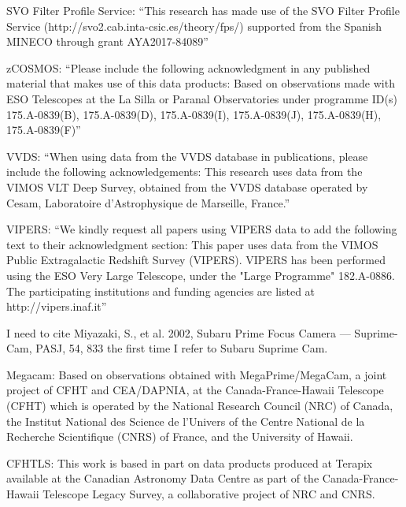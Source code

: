 
SVO Filter Profile Service: ``This research has made use of the SVO Filter Profile Service (http://svo2.cab.inta-csic.es/theory/fps/) supported from the Spanish MINECO through grant AYA2017-84089''

zCOSMOS: ``Please include the following acknowledgment in any published material that makes use of this data products: Based on observations made with ESO Telescopes at the La Silla or Paranal Observatories under programme ID(s) 175.A-0839(B), 175.A-0839(D), 175.A-0839(I), 175.A-0839(J), 175.A-0839(H), 175.A-0839(F)''

VVDS: ``When using data from the VVDS database in publications, please include the following acknowledgements: This research uses data from the VIMOS VLT Deep Survey, obtained from the VVDS database operated by Cesam, Laboratoire d'Astrophysique de Marseille, France.''

VIPERS: ``We kindly request all papers using VIPERS data to add the following text to their acknowledgment section: This paper uses data from the VIMOS Public Extragalactic Redshift Survey (VIPERS). VIPERS has been performed using the ESO Very Large Telescope, under the "Large Programme" 182.A-0886. The participating institutions and funding agencies are listed at http://vipers.inaf.it''

I need to cite Miyazaki, S., et al. 2002, Subaru Prime Focus Camera --- Suprime-Cam, PASJ, 54, 833 the first time I refer to Subaru Suprime Cam.

Megacam: Based on observations obtained with MegaPrime/MegaCam, a joint project of CFHT and CEA/DAPNIA, at the Canada-France-Hawaii Telescope (CFHT) which is operated by the National Research Council (NRC) of Canada, the Institut National des Science de l'Univers of the Centre National de la Recherche Scientifique (CNRS) of France, and the University of Hawaii.

CFHTLS: This work is based in part on data products produced at Terapix available at the Canadian Astronomy Data Centre as part of the Canada-France-Hawaii Telescope Legacy Survey, a collaborative project of NRC and CNRS.
